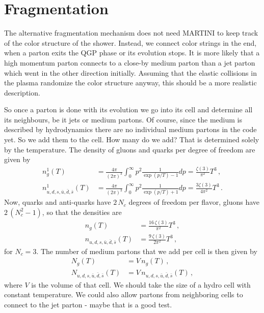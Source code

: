 \chapter{Fragmentation}
\label{fragmentation}

The alternative fragmentation mechanism does not need MARTINI to keep track of the color structure of the shower.
Instead, we connect color strings in the end, when a parton exits the QGP phase or its evolution stops.
It is more likely that a high momentum parton connects to a close-by medium parton than a jet parton which went in the other direction 
initially. Assuming that the elastic collisions in the plasma randomize the color structure anyway, this should be a more realistic description.

So once a parton is done with its evolution we go into its cell and determine all its neighbours, be it jets or medium 
partons. Of course, since the medium is described by hydrodynamics there are no individual medium partons in the code yet.
So we add them to the cell. How many do we add? That is determined solely by the temperature. 
The density of gluons and quarks per degree of freedom are given by
\begin{align}
  n_g^1(T) &= \frac{4\pi}{(2\pi)^3}\int_0^\infty p^2 \frac{1}{\exp(p/T)-1} dp = \frac{\zeta(3)}{\pi^2}T^3\,,\\
  n_{u,d,s,\bar{u},\bar{d},\bar{s}}^1(T) &= \frac{4\pi}{(2\pi)^3}\int_0^\infty p^2 \frac{1}{\exp(p/T)+1} dp = \frac{3 \zeta(3)}{4 \pi^2}T^3\,.
\end{align}
Now, quarks and anti-quarks have $2\,N_c$ degrees of freedom per flavor, gluons have $2\,(N_c^2-1)$, so that the densities are
\begin{align}
  n_g(T) &= \frac{16\,\zeta(3)}{\pi^2}T^3\,,\\
  n_{u,d,s,\bar{u},\bar{d},\bar{s}}(T) &= \frac{9\,\zeta(3)}{2 \pi^2}T^3\,,
\end{align}
for $N_c=3$.
The number of medium partons that we add per cell is then given by
\begin{align}
  N_{g}(T) &= V\, n_{g}(T)\,,\\
  N_{u,d,s,\bar{u},\bar{d},\bar{s}}(T) &= V\, n_{u,d,s,\bar{u},\bar{d},\bar{s}}(T)\,,
\end{align}
where $V$ is the volume of that cell. We should take the size of a hydro cell with constant temperature.
We could also allow partons from neighboring cells to connect to the jet parton - maybe that is a good test.

